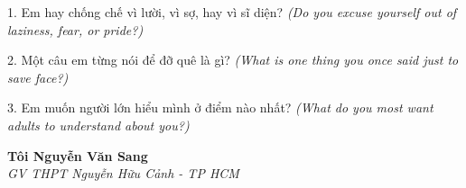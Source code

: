 \begin{tuhocnhanh}
1. Em hay chống chế vì lười, vì sợ, hay vì sĩ diện? \textit{(Do you excuse yourself out of laziness, fear, or pride?)}

2. Một câu em từng nói để đỡ quê là gì? \textit{(What is one thing you once said just to save face?)}

3. Em muốn người lớn hiểu mình ở điểm nào nhất? \textit{(What do you most want adults to understand about you?)}
\end{tuhocnhanh}

\begin{flushright}
\textbf{Tôi Nguyễn Văn Sang}\\
\textit{GV THPT Nguyễn Hữu Cảnh - TP HCM}
\end{flushright}

\ngancach
